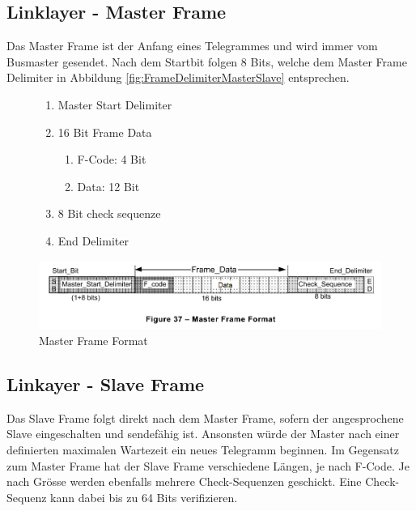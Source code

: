 \subsection{Linklayer - Master Frame}
\label{sub:MasterFrame}
Das Master Frame ist der Anfang eines Telegrammes und wird immer vom Busmaster gesendet. Nach dem Startbit folgen 8 Bits, welche dem Master Frame Delimiter in Abbildung \ref{fig:FrameDelimiterMasterSlave} entsprechen. 

\begin{figure}[H]
    \centering
    \begin{minipage}{0.33 \textwidth}
        \centering
        \begin{enumerate}
            \item Master Start Delimiter
            \item 16 Bit Frame Data
            \begin{enumerate}
                \item F-Code: 4 Bit
                \item Data: 12 Bit
            \end{enumerate}
            \item 8 Bit check sequenze 
            \item End Delimiter
        \end{enumerate}
    \end{minipage}
    \hfill
    \begin{minipage}{0.65 \textwidth}
        \includegraphics[width = \textwidth]{Figures/Chap2/Grundlagen/MVB_DOKU/Frames und Telegramme/Fig37_MasterFrameFormat.png}
        \caption{Master Frame Format}
        \label{fig:MasterFrameFormat}
    \end{minipage}
        
\end{figure}

\subsection{Linkayer - Slave Frame}
\label{sub:SlaveFrame}
Das Slave Frame folgt direkt nach dem Master Frame, sofern der angesprochene Slave eingeschalten und sendefähig ist. Ansonsten würde der Master nach einer definierten maximalen Wartezeit ein neues Telegramm beginnen. \newline
Im Gegensatz zum Master Frame hat der Slave Frame verschiedene Längen, je nach F-Code. Je nach Grösse werden ebenfalls mehrere Check-Sequenzen geschickt. Eine Check-Sequenz kann dabei bis zu 64 Bits verifizieren.

